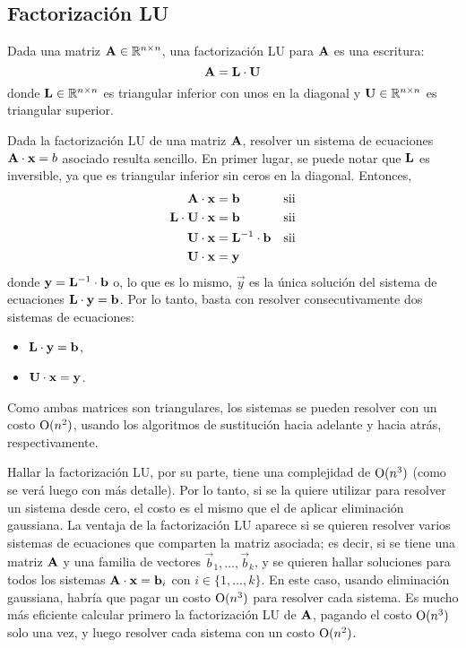 \subsection{Factorización LU}

Dada una matriz $\mathbf{A} \in \mathbb{R}^{n \times n}$, una factorización LU para
$\mathbf{A}$ es una escritura:
\[ \mathbf{A} = \mathbf{L} \cdot \mathbf{U} \]
donde $\mathbf{L} \in \mathbb{R}^{n \times n}$ es triangular inferior con unos en
la diagonal y $\mathbf{U} \in \mathbb{R}^{n \times n}$ es triangular superior.

Dada la factorización LU de una matriz $\mathbf{A}$, resolver un sistema de
ecuaciones $\mathbf{A} \cdot \mathbf{x} = b$ asociado resulta sencillo. En primer
lugar, se puede notar que $\mathbf{L}$ es inversible, ya que es triangular
inferior sin ceros en la diagonal. Entonces,
\[ \begin{aligned}
    \mathbf{A} \cdot \mathbf{x} &= \mathbf{b} &\text{sii} \\
    \mathbf{L} \cdot \mathbf{U} \cdot \mathbf{x} &= \mathbf{b} &\text{sii} \\
    \mathbf{U} \cdot \mathbf{x} &= \mathbf{L}^{-1} \cdot \mathbf{b} &\text{sii} \\
    \mathbf{U} \cdot \mathbf{x} &= \mathbf{y} \\
\end{aligned} \]
donde $\mathbf{y} = \mathbf{L}^{-1} \cdot \mathbf{b}$ o, lo que es lo mismo, $\vec{y}$
es la única solución del sistema de ecuaciones $\mathbf{L} \cdot \mathbf{y} =
\mathbf{b}$. Por lo tanto, basta con resolver consecutivamente dos sistemas de
ecuaciones:
\begin{itemize}
\item $\mathbf{L} \cdot \mathbf{y} = \mathbf{b}$,
\item $\mathbf{U} \cdot \mathbf{x} = \mathbf{y}$.
\end{itemize}
Como ambas matrices son triangulares, los sistemas se pueden resolver con
un costo $\mathrm{O}(n^2)$, usando los algoritmos de sustitución hacia adelante y
hacia atrás, respectivamente.

Hallar la factorización LU, por su parte, tiene una complejidad de $\mathrm{O}(n^3)$
(como se verá luego con más detalle). Por lo tanto, si se la quiere utilizar
para resolver un sistema desde cero, el costo es el mismo que el de aplicar
eliminación gaussiana. La ventaja de la factorización LU aparece si se quieren
resolver varios sistemas de ecuaciones que comparten la matriz asociada; es
decir, si se tiene una matriz $\mathbf{A}$ y una familia de vectores $\vec{b}_1,
\dots, \vec{b}_k$, y se quieren hallar soluciones para todos los sistemas
$\mathbf{A} \cdot \mathbf{x} = \mathbf{b}_i$ con $i \in \{1, \dots, k\}$. En este caso,
usando eliminación gaussiana, habría que pagar un costo $\mathrm{O}(n^3)$ para
resolver cada sistema. Es mucho más eficiente calcular primero la
factorización LU de $\mathbf{A}$, pagando el costo $\mathrm{O}(n^3)$ solo una vez, y
luego resolver cada sistema con un costo $\mathrm{O}(n^2)$.

